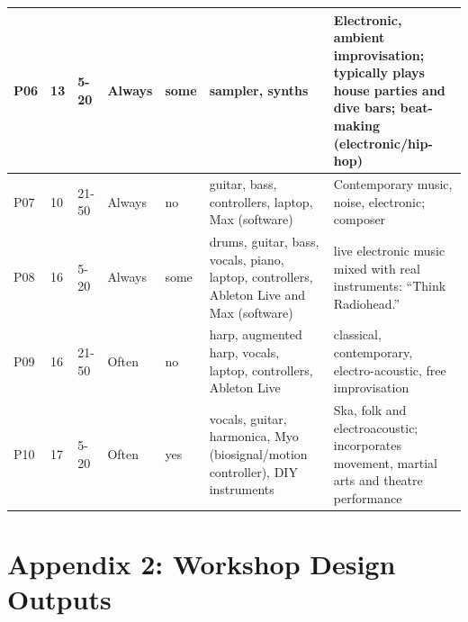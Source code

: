 \documentclass[letterpaper, 12pt]{article}
\begin{document}
\begin{spacing}{1.1}
\begin{longtable}{ C{0.6cm} C{1.1cm} C{1.3cm} C{1.3cm} C{1.3cm} L{3.2cm} L{4.6cm} }
        P06 &
        13 &
        5-20 &
        Always &
        some &
        sampler, synths &
        Electronic, ambient improvisation; typically plays house parties and dive bars; beat-making (electronic/hip-hop) \\ \hline
        
        P07 &
        10 &
        21-50 &
        Always &
        no &
        guitar, bass, controllers, laptop, Max (software) &
        Contemporary music, noise, electronic; composer \\ \hline
        
        P08 &
        16 &
        5-20 &
        Always &
        some &
        drums, guitar, bass, vocals, piano, laptop, controllers, Ableton Live and Max (software) &
        live electronic music mixed with real instruments: ``Think Radiohead.'' \\ \hline
        
        P09 &
        16 &
        21-50 &
        Often &
        no &
        harp, augmented harp, vocals, laptop, controllers, Ableton Live &
        classical, contemporary, electro-acoustic, free improvisation \\ \hline
        
        P10 &
        17 &
        5-20 &
        Often &
        yes &
        vocals, guitar, harmonica, Myo (biosignal/motion controller), DIY instruments &
        Ska, folk and electroacoustic; incorporates movement, martial arts and theatre performance \\ \hline
    \end{longtable}
\end{spacing}


\section*{Appendix 2: Workshop Design Outputs}
\end{document}

